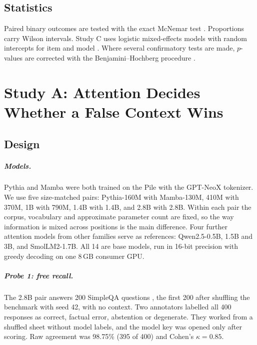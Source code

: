 \documentclass[11pt,a4paper,oneside]{report}
\begin{document}
\section{Statistics}
Paired binary outcomes are tested with the exact McNemar test \citep{mcnemar1947}. Proportions carry Wilson intervals. Study C uses logistic mixed-effects models with random intercepts for item and model \citep{bates2015}. Where several confirmatory tests are made, $p$-values are corrected with the Benjamini--Hochberg procedure \citep{benjamini1995}.

\chapter{Study A: Attention Decides Whether a False Context Wins}
\label{ch:a}

\section{Design}
\paragraph{Models.} Pythia \citep{biderman2023} and Mamba \citep{gu2024mamba} were both trained on the Pile \citep{gao2020} with the GPT-NeoX tokenizer. We use five size-matched pairs: Pythia-160M with Mamba-130M, 410M with 370M, 1B with 790M, 1.4B with 1.4B, and 2.8B with 2.8B. Within each pair the corpus, vocabulary and approximate parameter count are fixed, so the way information is mixed across positions is the main difference. Four further attention models from other families serve as references: Qwen2.5-0.5B, 1.5B and 3B, and SmolLM2-1.7B. All 14 are base models, run in 16-bit precision with greedy decoding on one 8\,GB consumer GPU.

\paragraph{Probe 1: free recall.} The 2.8B pair answers 200 SimpleQA questions \citep{wei2024}, the first 200 after shuffling the benchmark with seed 42, with no context. Two annotators labelled all 400 responses as correct, factual error, abstention or degenerate. They worked from a shuffled sheet without model labels, and the model key was opened only after scoring. Raw agreement was 98.75\% (395 of 400) and Cohen's $\kappa=0.85$.
\end{document}
